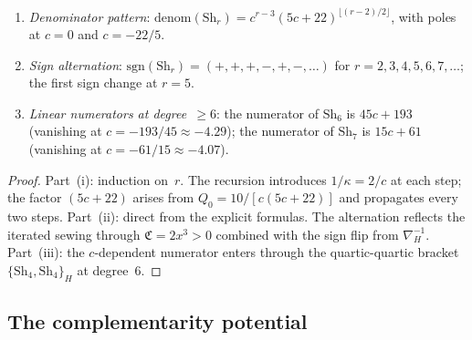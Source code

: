 \begin{proposition}
\label{prop:thqg-virasoro-structure}
\ClaimStatusProvedHere
{}
\begin{enumerate}[label=\textup{(\roman*)}]
\item \emph{Denominator pattern}:
 $\mathrm{denom}(\mathrm{Sh}_r) =
 c^{r-3}(5c+22)^{\lfloor(r-2)/2\rfloor}$,
 with poles at $c = 0$ and $c = -22/5$.
\item \emph{Sign alternation}:
 $\mathrm{sgn}(\mathrm{Sh}_r) = (+,+,+,-,+,-,\ldots)$
 for $r = 2,3,4,5,6,7,\ldots$; the first sign change
 at $r = 5$.
\item \emph{Linear numerators at degree~$\geq 6$}:
 the numerator of $\mathrm{Sh}_6$ is $45c + 193$
 \textup{(}vanishing at $c = -193/45 \approx -4.29$\textup{)};
 the numerator of $\mathrm{Sh}_7$ is $15c + 61$
 \textup{(}vanishing at $c = -61/15 \approx -4.07$\textup{)}.
\end{enumerate}
\end{proposition}

\begin{proof}
Part~(i): induction on~$r$. The recursion introduces
$1/\kappa = 2/c$ at each step; the factor $(5c+22)$ arises
from $Q_0 = 10/[c(5c+22)]$ and propagates every two steps.
Part~(ii): direct from the explicit formulas. The alternation
reflects the iterated sewing through $\mathfrak{C} = 2x^3 > 0$
combined with the sign flip from $\nabla_H^{-1}$.
Part~(iii): the $c$-dependent numerator enters through the
quartic-quartic bracket $\{\mathrm{Sh}_4,\mathrm{Sh}_4\}_H$
at degree~$6$.
\end{proof}



\subsection{The complementarity potential}

